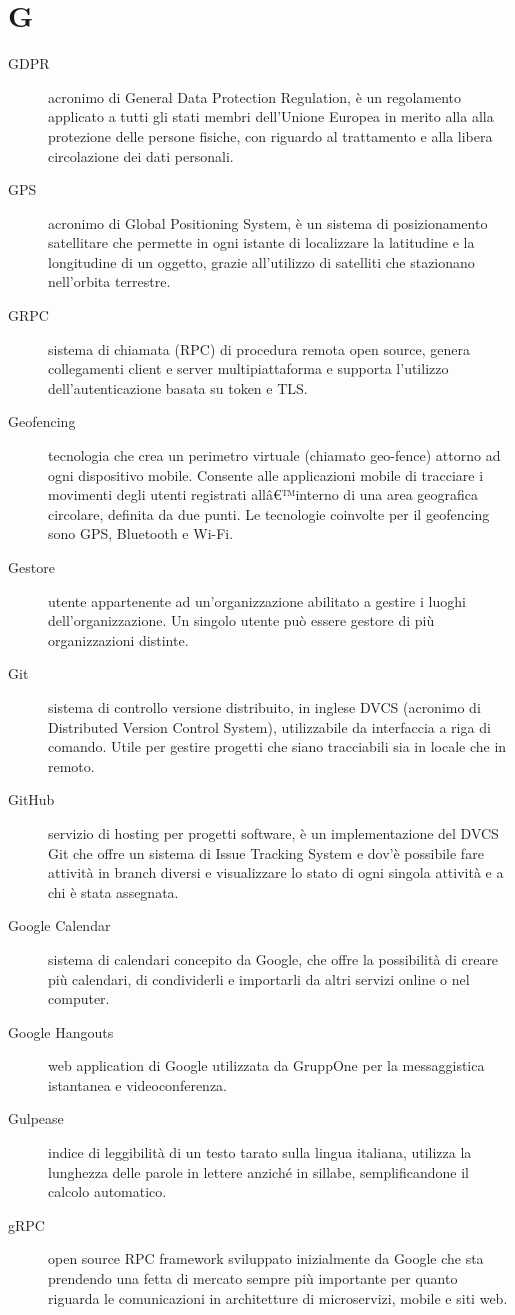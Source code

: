 \documentclass{article}
\begin{document}
\section{G}
\begin{description}
  \item[GDPR] acronimo di General Data Protection Regulation, è un regolamento applicato a tutti gli stati membri dell'Unione Europea in merito alla alla protezione delle persone fisiche, con riguardo al trattamento e alla libera circolazione dei dati personali.
  \item[GPS] acronimo di Global Positioning System, è un sistema di posizionamento satellitare che permette in ogni istante di localizzare la latitudine e la longitudine di un oggetto, grazie all'utilizzo di satelliti che stazionano nell'orbita terrestre.
  \item[GRPC] sistema di chiamata (RPC) di procedura remota open source, genera collegamenti client e server multipiattaforma e supporta l'utilizzo dell'autenticazione basata su token e TLS.
  \item[Geofencing] tecnologia che crea un perimetro virtuale (chiamato geo-fence) attorno ad ogni dispositivo mobile. Consente alle applicazioni mobile di tracciare i movimenti degli utenti registrati allâ€™interno di una area geografica circolare, definita da due punti. Le tecnologie coinvolte per il geofencing sono GPS, Bluetooth e Wi-Fi.
  \item[Gestore] utente appartenente ad un'organizzazione abilitato a gestire i luoghi dell'organizzazione. Un singolo utente può essere gestore di più organizzazioni distinte.
  \item[Git] sistema di controllo versione distribuito, in inglese DVCS (acronimo di Distributed Version Control System), utilizzabile da interfaccia a riga di comando. Utile per gestire progetti che siano tracciabili sia in locale che in remoto.
  \item[GitHub] servizio di hosting per progetti software, è un implementazione del DVCS Git che offre un sistema di Issue Tracking System e dov'è possibile fare attività in branch diversi e visualizzare lo stato di ogni singola attività e a chi è stata assegnata.
  \item[Google Calendar] sistema di calendari concepito da Google, che offre la possibilità di creare più calendari, di condividerli e importarli da altri servizi online o nel computer.
  \item[Google Hangouts] web application di Google utilizzata da GruppOne per la messaggistica istantanea e videoconferenza.
  \item[Gulpease] indice di leggibilità di un testo tarato sulla lingua italiana, utilizza la lunghezza delle parole in lettere anziché in sillabe, semplificandone il calcolo automatico.
  \item[gRPC] open source RPC framework sviluppato inizialmente da Google che sta prendendo una fetta di mercato sempre più importante per quanto riguarda le comunicazioni in architetture di microservizi, mobile e siti web.
\end{description}
\newpage
\end{document}
